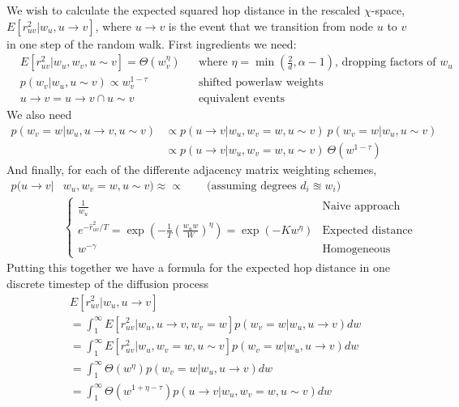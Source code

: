 We wish to calculate the expected squared hop distance in the rescaled $\chi$-space, $E[r_{uv}^2 | w_u, u \to v]$, where $u \to v$ is the event that we transition from node $u$ to $v$ in one step of the random walk. First ingredients we need:
\begin{align*}
  &E[r_{uv}^2 | w_u, w_v, u \sim v] = \Theta(w_v^\eta)
  && \text{where $\eta = \min(\frac{2}{d}, \alpha - 1)$, dropping factors of $w_u$}
  \\
  &p(w_v | w_u, u \sim v) \propto w_v^{1 - \tau}
  &&\text{shifted powerlaw weights}
  \\
  & u \to v = u \to v \cap u \sim v && \text{equivalent events}
\end{align*}
We also need
\begin{align*}
  p(w_v = w | w_u, u \to v, u \sim v) 
  &\propto p(u \to v | w_u, w_v=w, u \sim v) \: p(w_v = w | w_u, u \sim v)
  \\
  & \propto p(u \to v | w_u, w_v=w, u \sim v)\: \Theta(w^{1 - \tau})
\end{align*}
And finally, for each of the differente adjacency matrix weighting schemes,
\begin{align*}
  p(u \to v | & w_u, w_v=w, u \sim v) \approx \propto \quad\quad \text{(assuming degrees $d_i \approxeq w_i$)}
  \\ & \begin{cases}
    \frac{1}{w_u} & \text{Naive approach}
    \\
    e^{-\hat{r}_{uv}^2/T} = \exp(-\frac{1}{T} (\frac{w_u w}{W})^{\eta}) = \exp(-K w^{\eta})
    & \text{Expected distance}
    \\
    w^{-\gamma} & \text{Homogeneous}
  \end{cases}
\end{align*}
Putting this together we have a formula for the expected hop distance in one discrete timestep of the diffusion process
\begin{align}
  &E[r_{uv}^2 | w_u, u \to v]
  \\ 
  &= \int_1^\infty E[r_{uv}^2 | w_u, u \to v, w_v=w] p(w_v = w | w_u, u \to v) dw
  \\
  &= \int_1^\infty E[r_{uv}^2 | w_u, w_v =w, u \sim v] p(w_v = w | w_u, u \to v) dw
  \\
  &= \int_1^\infty \Theta(w^{\eta}) p(w_v = w | w_u, u \to v) dw
  \\
  &= \int_1^\infty \Theta(w^{1 + \eta - \tau}) p(u \to v | w_u, w_v=w, u \sim v) dw
\end{align}

